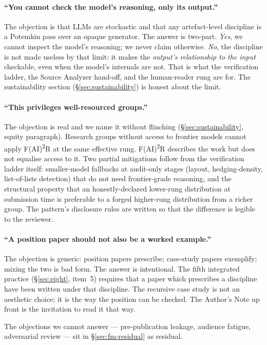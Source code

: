 \paragraph{``You cannot check the model's reasoning, only its
output.''}
The objection is that LLMs are stochastic and that any artefact-level
discipline is a Potemkin pass over an opaque generator. The answer
is two-part. \emph{Yes}, we cannot inspect the model's reasoning;
we never claim otherwise. \emph{No}, the discipline is not made
useless by that limit: it makes the \emph{output's relationship to
the input} checkable, even when the model's internals are not.
That is what the verification ladder, the Source Analyzer hand-off,
and the human-reader rung are for. The sustainability section
(\S\ref{sec:sustainability}) is honest about the limit.

\paragraph{``This privileges well-resourced groups.''}
The objection is real and we name it without flinching
(\S\ref{sec:sustainability}, equity paragraph). Research groups
without access to frontier models cannot apply F(AI)\textsuperscript{2}R
at the same effective rung. F(AI)\textsuperscript{2}R describes the
work but does not equalise access to it. Two partial mitigations
follow from the verification ladder itself: smaller-model fallbacks
at audit-only stages (layout, hedging-density, list-of-lists
detection) that do not need frontier-grade reasoning, and the
structural property that an honestly-declared lower-rung
distribution at submission time is preferable to a forged
higher-rung distribution from a richer group. The pattern's
disclosure rules are written so that the difference is legible to
the reviewer.

\paragraph{``A position paper should not also be a worked example.''}
The objection is generic: position papers prescribe; case-study
papers exemplify; mixing the two is bad form. The answer is
intentional. The fifth integrated practice
(\S\ref{sec:eight}, item~5) requires that a paper which prescribes
a discipline have been written under that discipline. The
recursive case study is not an aesthetic choice; it is the way the
position can be checked. The Author's Note up front is the
invitation to read it that way.

\bigskip
\noindent The objections we cannot answer --- pre-publication
leakage, audience fatigue, adversarial review --- sit in
\S\ref{sec:fm-residual} as residual.
